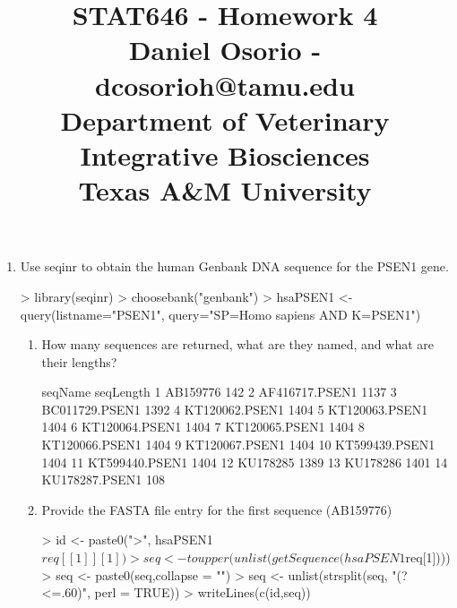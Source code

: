 \documentclass[12pt,a4paper]{paper}
\begin{document}
\title{STAT646 - Homework 4\\\small{Daniel Osorio - dcosorioh@tamu.edu\\Department of Veterinary Integrative Biosciences\\Texas A\&M University}}
\maketitle

\begin{enumerate}
\item Use seqinr to obtain the human Genbank DNA sequence for the PSEN1 gene.
\begin{Schunk}
\begin{Sinput}
> library(seqinr)
> choosebank("genbank")
> hsaPSEN1 <- query(listname="PSEN1", query="SP=Homo sapiens AND K=PSEN1")
\end{Sinput}
\end{Schunk}
\begin{enumerate}
\item How many sequences are returned, what are they named, and what are their lengths?
\begin{Schunk}
\begin{Soutput}
          seqName seqLength
1        AB159776       142
2  AF416717.PSEN1      1137
3  BC011729.PSEN1      1392
4  KT120062.PSEN1      1404
5  KT120063.PSEN1      1404
6  KT120064.PSEN1      1404
7  KT120065.PSEN1      1404
8  KT120066.PSEN1      1404
9  KT120067.PSEN1      1404
10 KT599439.PSEN1      1404
11 KT599440.PSEN1      1404
12       KU178285      1389
13       KU178286      1401
14 KU178287.PSEN1       108
\end{Soutput}
\end{Schunk}
\item Provide the FASTA file entry for the first sequence (AB159776)
\begin{Schunk}
\begin{Sinput}
> id <- paste0(">", hsaPSEN1$req[[1]][1])
> seq <- toupper(unlist(getSequence(hsaPSEN1$req[1])))
> seq <- paste0(seq,collapse = "")
> seq <- unlist(strsplit(seq, "(?<=.{60})", perl = TRUE))
> writeLines(c(id,seq))
\end{Sinput}

\end{Schunk}
\end{enumerate}
\end{enumerate}
\end{document}
